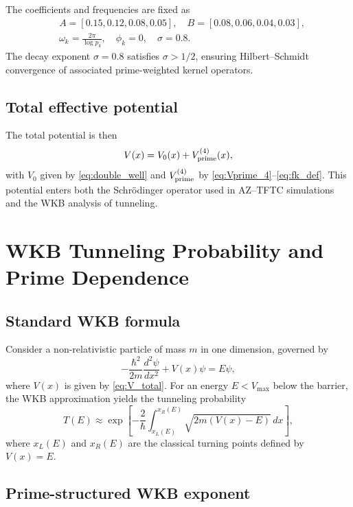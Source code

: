 \documentclass[11pt]{article}
\begin{document}
The coefficients and frequencies are fixed as
\begin{align}
  &A = [0.15, 0.12, 0.08, 0.05],\quad
    B = [0.08, 0.06, 0.04, 0.03],\nonumber\\
  &\omega_k = \frac{2\pi}{\log p_k},\quad
    \phi_k = 0,\quad \sigma = 0.8.
\end{align}
The decay exponent \(\sigma=0.8\) satisfies \(\sigma>1/2\), ensuring
Hilbert--Schmidt convergence of associated prime-weighted kernel
operators.\cite{tunneling_topology_draft}

\subsection{Total effective potential}

The total potential is then
\begin{equation}
  V(x) = V_0(x) + V_{\rm prime}^{(4)}(x),
  \label{eq:V_total}
\end{equation}
with \(V_0\) given by \eqref{eq:double_well} and
\(V_{\rm prime}^{(4)}\) by \eqref{eq:Vprime_4}--\eqref{eq:fk_def}. This
potential enters both the Schr\"odinger operator used in AZ--TFTC
simulations and the WKB analysis of tunneling.

\section{WKB Tunneling Probability and Prime Dependence}

\subsection{Standard WKB formula}

Consider a non-relativistic particle of mass \(m\) in one dimension,
governed by
\begin{equation}
  -\frac{\hbar^2}{2m}\frac{d^2\psi}{dx^2} + V(x)\psi = E\psi,
\end{equation}
where \(V(x)\) is given by \eqref{eq:V_total}. For an energy
\(E < V_{\text{max}}\) below the barrier, the WKB approximation yields
the tunneling probability
\begin{equation}
  T(E) \approx
  \exp\left[
    -\frac{2}{\hbar}
    \int_{x_L(E)}^{x_R(E)}
    \sqrt{2m\left(V(x) - E\right)}\,dx
  \right],
  \label{eq:T_WKB}
\end{equation}
where \(x_L(E)\) and \(x_R(E)\) are the classical turning points
defined by \(V(x)=E\).

\subsection{Prime-structured WKB exponent}
\end{document}
